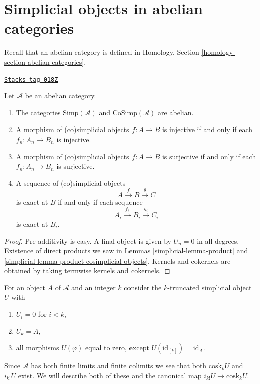 \section{Simplicial objects in abelian categories}
\label{simplicial-section-abelian}
Recall that an abelian category is defined
in Homology, Section \ref{homology-section-abelian-categories}.

\begin{lemma}[Abelian]
\label{simplicial-lemma-abelian}
\href{https://stacks.math.columbia.edu/tag/018Z}{\texttt{Stacks tag 018Z}}

Let $\mathcal{A}$ be an abelian category.
\begin{enumerate}
\item The categories $\text{Simp}(\mathcal{A})$ and
$\text{CoSimp}(\mathcal{A})$ are abelian.
\item A morphism of (co)simplicial objects
$f : A \to B$ is injective
if and only if each $f_n : A_n \to B_n$ is injective.
\item A morphism of (co)simplicial objects
$f : A \to B$ is surjective
if and only if each $f_n : A_n \to B_n$ is surjective.
\item A sequence of (co)simplicial objects
$$
A \xrightarrow{f} B \xrightarrow{g} C
$$
is exact at $B$ if and only if each sequence
$$
A_i \xrightarrow{f_i} B_i \xrightarrow{g_i} C_i
$$
is exact at $B_i$.
\end{enumerate}
\end{lemma}

\begin{proof}

Pre-additivity is easy. A final object is
given by $U_n = 0$ in all degrees.
Existence of direct products we saw in
Lemmas \ref{simplicial-lemma-product} and
\ref{simplicial-lemma-product-cosimplicial-objects}.
Kernels and cokernels are obtained by taking
termwise kernels and cokernels.
\end{proof}

For an object $A$ of $\mathcal{A}$ and an integer
$k$ consider the $k$-truncated simplicial object
$U$ with
\begin{enumerate}
\item $U_i = 0$ for $i < k$,
\item $U_k = A$,
\item all morphisms $U(\varphi)$ equal to zero,
except $U(\text{id}_{[k]}) = \text{id}_A$.
\end{enumerate}
Since $\mathcal{A}$ has both finite limits and finite colimits
we see that both $\text{cosk}_k U$ and $i_{k!}U$ exist.
We will describe both of these and the canonical
map $i_{k!}U \to \text{cosk}_kU$.

